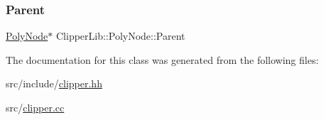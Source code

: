 \mbox{\label{class_clipper_lib_1_1_poly_node_a9465bc02623316de2af3ab52c6f7041e}} 
\subsubsection{\texorpdfstring{Parent}{Parent}}
{\footnotesize\ttfamily \mbox{\hyperlink{class_clipper_lib_1_1_poly_node}{Poly\+Node}}$\ast$ Clipper\+Lib\+::\+Poly\+Node\+::\+Parent}



The documentation for this class was generated from the following files\+:\begin{DoxyCompactItemize}
\item 
src/include/\mbox{\hyperlink{clipper_8hh}{clipper.\+hh}}\item 
src/\mbox{\hyperlink{clipper_8cc}{clipper.\+cc}}\end{DoxyCompactItemize}
